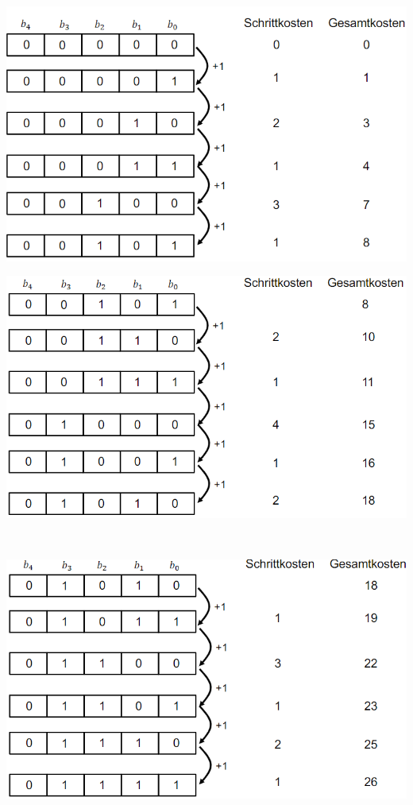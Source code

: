 \documentclass[
    ngerman,
    color=3b,
    dark_mode,
    load_common, %
    summary,
    boxarc,
]{tuda_summary}
\begin{document}
\begin{minipage}{0.5\textwidth}
    \includegraphics[width=\textwidth]{pictures/aggregat1.PNG}
\end{minipage}
\begin{minipage}{0.5\textwidth-2.22168pt}
    \includegraphics[width=\textwidth]{pictures/aggregat2.PNG}
\end{minipage}
\vspace{1em}\\
\begin{minipage}{0.5\textwidth}
    \includegraphics[width=\textwidth]{pictures/aggregat3.PNG}
\end{minipage}
\end{document}
